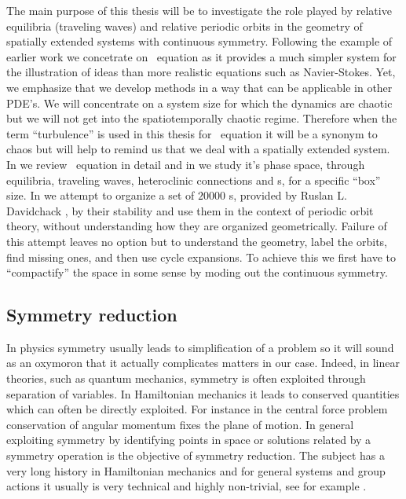 The main purpose of this thesis will be to investigate the role played by relative equilibria (traveling waves) 
and relative periodic orbits in the geometry of spatially extended systems with continuous symmetry. Following
the example of earlier work we concetrate on \KS\ equation as it provides a much simpler system for the illustration
of ideas than more realistic equations such as Navier-Stokes. Yet, we emphasize that we develop methods in
a way that can be applicable in other PDE's. We will concentrate on a system size for which the dynamics
are chaotic but we will not get into the spatiotemporally chaotic regime. Therefore when the term ``turbulence'' is
used in this thesis for \KS\ equation it will be a synonym to chaos but will help  
to remind us that we deal with a spatially extended system. In  we review \KS\ equation in detail
and in  we study it's phase space, through equilibria, traveling waves, heteroclinic connections
and \rpo s, for a specific ``box'' size. In  we attempt to
organize a set of $20000$ \rpo s, provided by Ruslan L. Davidchack , by their stability and use them in the context of periodic orbit theory, without understanding how they are organized geometrically. Failure of this attempt leaves no option but to understand the geometry, label the orbits, find missing ones, and then use cycle expansions.
To achieve this we first have to ``compactify'' the space in some sense by moding out the continuous symmetry.

\subsection{Symmetry reduction}

In physics symmetry usually leads to simplification of a problem so it will sound as an oxymoron that it actually
complicates matters in our case. Indeed, in linear theories, such as quantum mechanics, symmetry is often exploited
through separation of variables. In Hamiltonian mechanics it leads to conserved quantities which can often be
directly exploited. For instance in the central force problem conservation of angular momentum fixes the plane
of motion. %
In general exploiting symmetry by identifying points in space or solutions 
related by a symmetry operation is the objective of 
symmetry reduction. The subject has a very long history in Hamiltonian mechanics and for general systems
and group actions it usually is very technical and highly non-trivial, see for example .

